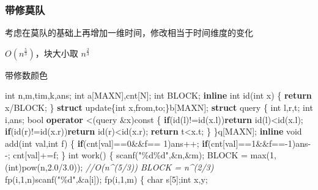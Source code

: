 \documentclass[
]{article}
\newenvironment{Shaded}{}{}
\newcommand{\AttributeTok}[1]{\textcolor[rgb]{0.49,0.56,0.16}{#1}}
\newcommand{\CommentTok}[1]{\textcolor[rgb]{0.38,0.63,0.69}{\textit{#1}}}
\newcommand{\ControlFlowTok}[1]{\textcolor[rgb]{0.00,0.44,0.13}{\textbf{#1}}}
\newcommand{\DataTypeTok}[1]{\textcolor[rgb]{0.56,0.13,0.00}{#1}}
\newcommand{\DecValTok}[1]{\textcolor[rgb]{0.25,0.63,0.44}{#1}}
\newcommand{\FloatTok}[1]{\textcolor[rgb]{0.25,0.63,0.44}{#1}}
\newcommand{\KeywordTok}[1]{\textcolor[rgb]{0.00,0.44,0.13}{\textbf{#1}}}
\newcommand{\NormalTok}[1]{#1}
\newcommand{\SpecialCharTok}[1]{\textcolor[rgb]{0.25,0.44,0.63}{#1}}
\newcommand{\StringTok}[1]{\textcolor[rgb]{0.25,0.44,0.63}{#1}}
\begin{document}
\hypertarget{ux5e26ux4feeux83abux961f}{%
\subsubsection{带修莫队}\label{ux5e26ux4feeux83abux961f}}

考虑在莫队的基础上再增加一维时间，修改相当于时间维度的变化

\(O(n^{\frac{5}{3}})\)，块大小取 \(n^{\frac{2}{3}}\)

带修数颜色

\begin{Shaded}
\begin{Highlighting}[]
\DataTypeTok{int}\NormalTok{ n,m,tim,k,ans;}
\DataTypeTok{int}\NormalTok{ a[MAXN],cnt[N];}
\DataTypeTok{int}\NormalTok{ BLOCK;}
\KeywordTok{inline} \DataTypeTok{int}\NormalTok{ id(}\DataTypeTok{int}\NormalTok{ x)}
\NormalTok{\{}
    \ControlFlowTok{return}\NormalTok{ x/BLOCK;    }
\NormalTok{\}}
\KeywordTok{struct}\NormalTok{ update\{}\DataTypeTok{int}\NormalTok{ x,from,to;\}b[MAXN];}
\KeywordTok{struct}\NormalTok{ query}
\NormalTok{\{}
    \DataTypeTok{int}\NormalTok{ l,r,t;}
    \DataTypeTok{int}\NormalTok{ i,ans;}
    \DataTypeTok{bool} \KeywordTok{operator}\NormalTok{ \textless{}(query \&x)}\AttributeTok{const}
\NormalTok{    \{}
        \ControlFlowTok{if}\NormalTok{(id(l)!=id(x.l))}\ControlFlowTok{return}\NormalTok{ id(l)\textless{}id(x.l);}
        \ControlFlowTok{if}\NormalTok{(id(r)!=id(x.r))}\ControlFlowTok{return}\NormalTok{ id(r)\textless{}id(x.r);}
        \ControlFlowTok{return}\NormalTok{ t\textless{}x.t;}
\NormalTok{    \}}
\NormalTok{\}q[MAXN];}
\KeywordTok{inline} \DataTypeTok{void}\NormalTok{ add(}\DataTypeTok{int}\NormalTok{ val,}\DataTypeTok{int}\NormalTok{ f)}
\NormalTok{\{}
    \ControlFlowTok{if}\NormalTok{(cnt[val]==}\DecValTok{0}\NormalTok{\&\&f== }\DecValTok{1}\NormalTok{)ans++;}
    \ControlFlowTok{if}\NormalTok{(cnt[val]==}\DecValTok{1}\NormalTok{\&\&f=={-}}\DecValTok{1}\NormalTok{)ans{-}{-};}
\NormalTok{    cnt[val]+=f;}
\NormalTok{\}}
\DataTypeTok{int}\NormalTok{ work()}
\NormalTok{\{}
\NormalTok{    scanf(}\StringTok{"}\SpecialCharTok{\%d\%d}\StringTok{"}\NormalTok{,\&n,\&m); BLOCK = max(}\DecValTok{1}\NormalTok{,(}\DataTypeTok{int}\NormalTok{)pow(n,}\FloatTok{2.0}\NormalTok{/}\FloatTok{3.0}\NormalTok{));}
    \CommentTok{//O(n\^{}(5/3)) BLOCK = n\^{}(2/3)}
\NormalTok{    fp(i,}\DecValTok{1}\NormalTok{,n)scanf(}\StringTok{"}\SpecialCharTok{\%d}\StringTok{"}\NormalTok{,\&a[i]);}
\NormalTok{    fp(i,}\DecValTok{1}\NormalTok{,m)}
\NormalTok{    \{}
        \DataTypeTok{char}\NormalTok{ s[}\DecValTok{5}\NormalTok{];}\DataTypeTok{int}\NormalTok{ x,y;}

\end{Highlighting}
\end{Shaded}
\end{document}
